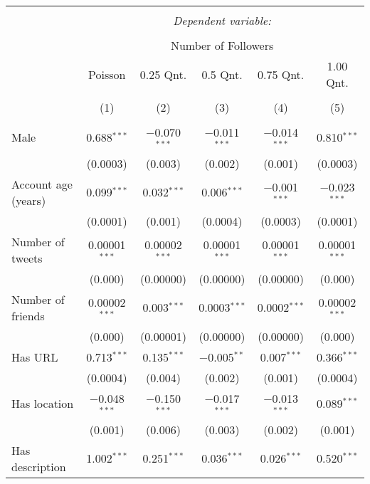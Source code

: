 
\begin{table}[!htbp] \centering 
  \caption{} 
  \label{} 
\begin{tabular}{@{\extracolsep{5pt}}lccccc} 
\\[-1.8ex]\hline 
\hline \\[-1.8ex] 
 & \multicolumn{5}{c}{\textit{Dependent variable:}} \\ 
\cline{2-6} 
\\[-1.8ex] & \multicolumn{5}{c}{Number of Followers} \\ 
 & Poisson & 0.25 Qnt. & 0.5 Qnt. & 0.75 Qnt. & 1.00 Qnt. \\ 
\\[-1.8ex] & (1) & (2) & (3) & (4) & (5)\\ 
\hline \\[-1.8ex] 
 Male & 0.688$^{***}$ & $-$0.070$^{***}$ & $-$0.011$^{***}$ & $-$0.014$^{***}$ & 0.810$^{***}$ \\ 
  & (0.0003) & (0.003) & (0.002) & (0.001) & (0.0003) \\ 
  Account age (years) & 0.099$^{***}$ & 0.032$^{***}$ & 0.006$^{***}$ & $-$0.001$^{***}$ & $-$0.023$^{***}$ \\ 
  & (0.0001) & (0.001) & (0.0004) & (0.0003) & (0.0001) \\ 
  Number of tweets & 0.00001$^{***}$ & 0.00002$^{***}$ & 0.00001$^{***}$ & 0.00001$^{***}$ & 0.00001$^{***}$ \\ 
  & (0.000) & (0.00000) & (0.00000) & (0.00000) & (0.000) \\ 
  Number of friends & 0.00002$^{***}$ & 0.003$^{***}$ & 0.0003$^{***}$ & 0.0002$^{***}$ & 0.00002$^{***}$ \\ 
  & (0.000) & (0.00001) & (0.00000) & (0.00000) & (0.000) \\ 
  Has URL & 0.713$^{***}$ & 0.135$^{***}$ & $-$0.005$^{**}$ & 0.007$^{***}$ & 0.366$^{***}$ \\ 
  & (0.0004) & (0.004) & (0.002) & (0.001) & (0.0004) \\ 
  Has location & $-$0.048$^{***}$ & $-$0.150$^{***}$ & $-$0.017$^{***}$ & $-$0.013$^{***}$ & 0.089$^{***}$ \\ 
  & (0.001) & (0.006) & (0.003) & (0.002) & (0.001) \\ 
  Has description & 1.002$^{***}$ & 0.251$^{***}$ & 0.036$^{***}$ & 0.026$^{***}$ & 0.520$^{***}$ \\ 

\end{tabular}
\end{table}
